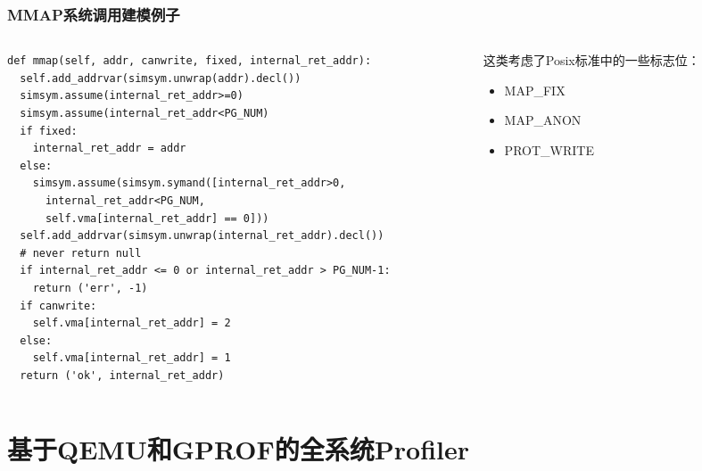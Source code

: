 \documentclass{beamer}
\begin{document}

\begin{frame}[fragile]
	\frametitle{MMAP系统调用建模例子}
	\begin{columns}
	\begin{column}{0.7\textwidth}
	\tiny{
		\begin{Verbatim}[frame=single]
def mmap(self, addr, canwrite, fixed, internal_ret_addr):
  self.add_addrvar(simsym.unwrap(addr).decl())
  simsym.assume(internal_ret_addr>=0)
  simsym.assume(internal_ret_addr<PG_NUM)
  if fixed:
    internal_ret_addr = addr
  else:
    simsym.assume(simsym.symand([internal_ret_addr>0,
      internal_ret_addr<PG_NUM,
      self.vma[internal_ret_addr] == 0]))
  self.add_addrvar(simsym.unwrap(internal_ret_addr).decl())
  # never return null
  if internal_ret_addr <= 0 or internal_ret_addr > PG_NUM-1:
    return ('err', -1)
  if canwrite:
    self.vma[internal_ret_addr] = 2
  else:
    self.vma[internal_ret_addr] = 1
  return ('ok', internal_ret_addr)
    \end{Verbatim}
	}
  	\end{column}

  	\begin{column}{0.3\textwidth}
		这类考虑了Posix标准中的一些标志位：
		\begin{itemize}
			\item MAP\_FIX
			\item MAP\_ANON
			\item PROT\_WRITE
		\end{itemize}
  	\end{column}
	\end{columns}
\end{frame}

\section{基于QEMU和GPROF的全系统Profiler}
\end{document}
